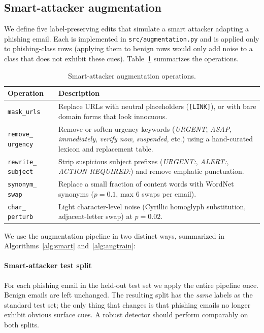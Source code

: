 \documentclass[conference]{IEEEtran}
\begin{document}
\subsection{Smart-attacker augmentation}
\label{sec:augmentation}
We define five label-preserving edits that simulate a smart attacker
adapting a phishing email. Each is implemented in
\texttt{src/augmentation.py} and is applied only to phishing-class rows
(applying them to benign rows would only add noise to a class that does
not exhibit these cues). Table~\ref{tab:ops} summarizes the operations.

\begin{table}[t]
\caption{Smart-attacker augmentation operations.}
\label{tab:ops}
\centering
\begin{tabular}{p{} p{}}
\toprule
\textbf{Operation} & \textbf{Description} \\
\midrule
\texttt{mask\_urls} & Replace URLs with neutral placeholders (\texttt{[LINK]}), or with bare domain forms that look innocuous. \\
\texttt{remove\_} \texttt{urgency} & Remove or soften urgency keywords (\textit{URGENT}, \textit{ASAP}, \textit{immediately}, \textit{verify now}, \textit{suspended}, etc.) using a hand-curated lexicon and replacement table. \\
\texttt{rewrite\_} \texttt{subject} & Strip suspicious subject prefixes (\textit{URGENT:}, \textit{ALERT:}, \textit{ACTION REQUIRED:}) and remove emphatic punctuation. \\
\texttt{synonym\_} \texttt{swap} & Replace a small fraction of content words with WordNet synonyms ($p\!=\!0.1$, max 6 swaps per email). \\
\texttt{char\_} \texttt{perturb} & Light character-level noise (Cyrillic homoglyph substitution, adjacent-letter swap) at $p\!=\!0.02$. \\
\bottomrule
\end{tabular}
\end{table}

We use the augmentation pipeline in two distinct ways, summarized in
Algorithms~\ref{alg:smart} and~\ref{alg:augtrain}:

\paragraph{Smart-attacker test split} For each phishing email in the
held-out test set we apply the entire pipeline once. Benign emails are left
unchanged. The resulting split has the \emph{same} labels as the standard
test set; the only thing that changes is that phishing emails no longer
exhibit obvious surface cues. A robust detector should perform comparably on
both splits.
\end{document}
